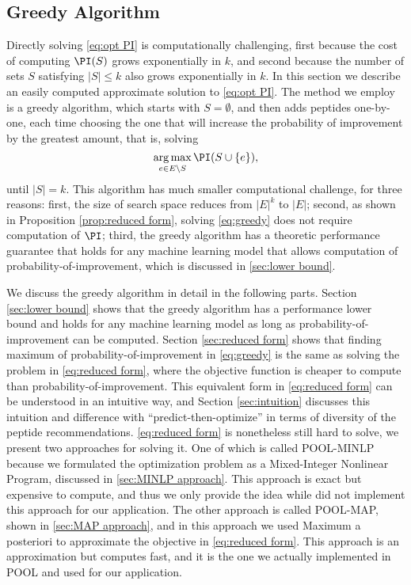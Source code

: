 \subsection{Greedy Algorithm} \label{sec:greedy algorithm}
Directly solving \eqref{eq:opt PI} is computationally challenging, first because the cost of computing $\PI(S)$
grows exponentially in $k$, and second because the number of sets $S$ satisfying $|S| \leq k$
also grows exponentially in $k$. In this section we describe an easily computed approximate solution to
\eqref{eq:opt PI}. The method we employ is a greedy algorithm, which starts with $S = \emptyset$, and then adds
peptides one-by-one, each time choosing the one that will increase the probability of 
improvement by the greatest amount, that is, solving 
\begin{equation}
  \underset{e \in E \backslash S}{\mathrm{arg}\max} \,\PI (S \cup \{e\}),
  \label{eq:greedy}
\end{equation}
until $|S| = k$. This algorithm has much smaller computational challenge, for three reasons:
first, the size of search space reduces from $|E|^k$ to $|E|$; second, as shown in Proposition 
\ref{prop:reduced form}, solving \eqref{eq:greedy} does not require computation of $\PI$;
third, the greedy algorithm has a theoretic performance guarantee that holds for any machine
learning model that allows computation of probability-of-improvement, which is discussed in \ref{sec:lower bound}.

We discuss the greedy algorithm in detail in the following parts. Section \ref{sec:lower bound} shows that the greedy
algorithm has a performance lower bound and holds for any machine learning model as long as probability-of-improvement
can be computed. Section \ref{sec:reduced form} shows that finding maximum of probability-of-improvement in \eqref{eq:greedy} is the same as 
solving the problem in \eqref{eq:reduced form}, where the objective function is cheaper to compute than probability-of-improvement.
This equivalent form in \eqref{eq:reduced form} can be understood in an intuitive way, and Section \ref{sec:intuition} discusses 
this intuition and difference with \enquote{predict-then-optimize} in terms of diversity of the peptide recommendations. 
\eqref{eq:reduced form} is nonetheless still hard to solve, we present two approaches for solving it. One of which
is called POOL-MINLP because we formulated the optimization problem as a Mixed-Integer Nonlinear Program, discussed 
in \ref{sec:MINLP approach}. This approach is exact but expensive to compute, and thus we only provide the idea while 
did not implement this approach for our application. 
The other approach is called POOL-MAP, shown in \ref{sec:MAP approach}, and in this approach we used Maximum a posteriori to 
approximate the objective in \eqref{eq:reduced form}. This approach is an approximation but computes fast, and it is 
the one we actually implemented in POOL and used for our application.

